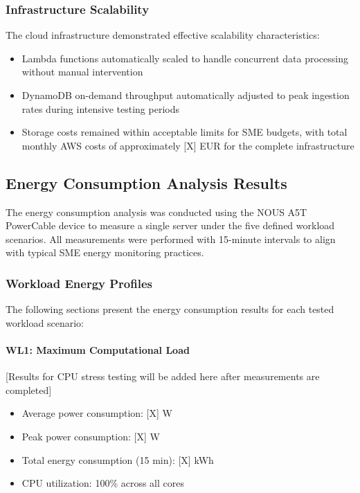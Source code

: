 \subsubsection{Infrastructure Scalability}
The cloud infrastructure demonstrated effective scalability characteristics:
\begin{itemize}
    \item Lambda functions automatically scaled to handle concurrent data processing 
    without manual intervention
    \item DynamoDB on-demand throughput automatically adjusted to peak ingestion rates 
    during intensive testing periods
    \item Storage costs remained within acceptable limits for SME budgets, with total 
    monthly AWS costs of approximately [X] EUR for the complete infrastructure
\end{itemize}

\subsection{Energy Consumption Analysis Results}
The energy consumption analysis was conducted using the NOUS A5T PowerCable device to 
measure a single server under the five defined workload scenarios. All measurements were 
performed with 15-minute intervals to align with typical SME energy monitoring practices.

\subsubsection{Workload Energy Profiles}
The following sections present the energy consumption results for each tested workload 
scenario:

\paragraph{WL1: Maximum Computational Load}
[Results for CPU stress testing will be added here after measurements are completed]
\begin{itemize}
    \item Average power consumption: [X] W
    \item Peak power consumption: [X] W  
    \item Total energy consumption (15 min): [X] kWh
    \item CPU utilization: 100\% across all cores
\end{itemize}

